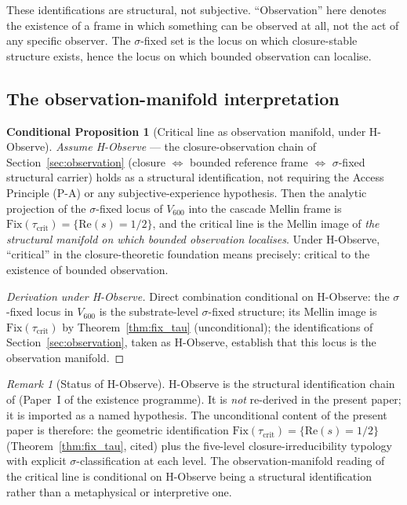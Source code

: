 \documentclass[11pt,a4paper]{article}
\theoremstyle{definition}
\newtheorem{conditional}[theorem]{Conditional Proposition}
\theoremstyle{remark}
\newtheorem{remark}[theorem]{Remark}
\begin{document}
These identifications are structural, not subjective. ``Observation'' here
denotes the existence of a frame in which something can be observed at all,
not the act of any specific observer. The $\sigma$-fixed set is the locus
on which closure-stable structure exists, hence the locus on which
bounded observation can localise.

\subsection{The observation-manifold interpretation}

\begin{conditional}[Critical line as observation manifold, under H-Observe]\label{thm:observation_manifold}
\emph{Assume H-Observe} --- the closure-observation chain of
Section~\ref{sec:observation} (closure $\iff$ bounded reference frame
$\iff$ $\sigma$-fixed structural carrier) holds as a structural
identification, not requiring the Access Principle (P-A) or any
subjective-experience hypothesis. Then the analytic projection of the
$\sigma$-fixed locus of $V_{600}$ into the cascade Mellin frame is
$\mathrm{Fix}(\tau_{\mathrm{crit}}) = \{\mathrm{Re}(s) = 1/2\}$, and the
critical line is the Mellin image of \emph{the structural manifold on
which bounded observation localises}. Under H-Observe, ``critical'' in
the closure-theoretic foundation means precisely: critical to the
existence of bounded observation.
\end{conditional}

\begin{proof}[Derivation under H-Observe]
Direct combination conditional on H-Observe: the $\sigma$-fixed locus
in $V_{600}$ is the substrate-level $\sigma$-fixed structure; its
Mellin image is $\mathrm{Fix}(\tau_{\mathrm{crit}})$ by
Theorem~\ref{thm:fix_tau} (unconditional); the identifications of
Section~\ref{sec:observation}, taken as H-Observe, establish that this
locus is the observation manifold.
\end{proof}

\begin{remark}[Status of H-Observe]
H-Observe is the structural identification chain of
\cite{SmartExistenceClosure} (Paper~I of the existence programme). It is
\emph{not} re-derived in the present paper; it is imported as a named
hypothesis. The unconditional content of the present paper is therefore:
the geometric identification $\mathrm{Fix}(\tau_{\mathrm{crit}}) =
\{\mathrm{Re}(s) = 1/2\}$ (Theorem~\ref{thm:fix_tau}, cited) plus the
five-level closure-irreducibility typology with explicit
$\sigma$-classification at each level. The observation-manifold reading
of the critical line is conditional on H-Observe being a structural
identification rather than a metaphysical or interpretive one.
\end{remark}
\end{document}
